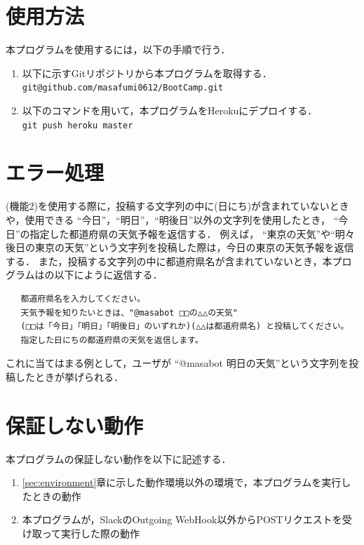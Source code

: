 \documentclass[12pt]{jsarticle}
\begin{document}
\section{使用方法}
本プログラムを使用するには，以下の手順で行う．
\begin{enumerate}
\item 以下に示すGitリポジトリから本プログラムを取得する．\\
  \verb|git@github.com/masafumi0612/BootCamp.git|

\item 以下のコマンドを用いて，本プログラムをHerokuにデプロイする．\\
  \verb|git push heroku master|
\end{enumerate}

\section{エラー処理}
(機能2)を使用する際に，投稿する文字列の中に(日にち)が含まれていないときや，使用できる ``今日''，``明日''，``明後日''以外の文字列を使用したとき， ``今日''の指定した都道府県の天気予報を返信する．
例えば， ``東京の天気''や``明々後日の東京の天気''という文字列を投稿した際は，今日の東京の天気予報を返信する．
また，投稿する文字列の中に都道府県名が含まれていないとき，本プログラムはの以下にように返信する．
\begin{verbatim}
   都道府県名を入力してください。
   天気予報を知りたいときは、"@masabot □□の△△の天気" 
   (□□は「今日」「明日」「明後日」のいずれか)(△△は都道府県名) と投稿してください。
   指定した日にちの都道府県の天気を返信します。
\end{verbatim}
これに当てはまる例として，ユーザが ``@masabot 明日の天気''という文字列を投稿したときが挙げられる．

\section{保証しない動作}
本プログラムの保証しない動作を以下に記述する． 
\begin{enumerate}
\item \ref{sec:environment}章に示した動作環境以外の環境で，本プログラムを実行したときの動作
\item 本プログラムが，SlackのOutgoing WebHook以外からPOSTリクエストを受け取って実行した際の動作
  
\end{enumerate}



\end{document}
